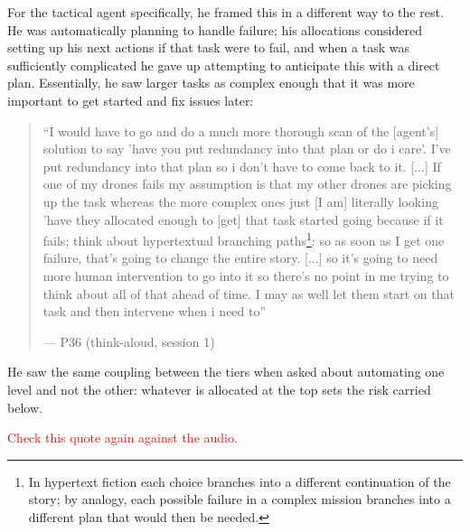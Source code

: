 For the tactical agent specifically, he framed this in a different way to the rest. He was automatically planning to handle failure; his allocations considered setting up his next actions if that task were to fail, and when a task was sufficiently complicated he gave up attempting to anticipate this with a direct plan. Essentially, he saw larger tasks as complex enough that it was more important to get started and fix issues later:

\begin{quote}\small
``I would have to go and do a much more thorough scan of the [agent's] solution to say 'have you put redundancy into that plan or do i care'. I've put redundancy into that plan so i don't have to come back to it. [...] If one of my drones fails my assumption is that my other drones are picking up the task whereas the more complex ones just [I am] literally looking 'have they allocated enough to [get] that task started going because if it fails; think about hypertextual branching paths\footnote{{\color{blue}In hypertext fiction each choice branches into a different continuation of the story; by analogy, each possible failure in a complex mission branches into a different plan that would then be needed.}}: so as soon as I get one failure, that's going to change the entire story. [...] so it's going to need more human intervention to go into it so there's no point in me trying to think about all of that ahead of time. I may as well let them start on that task and then intervene when i need to''\par\hfill--- P36 (think-aloud, session 1)
\end{quote}

{\color{blue}He saw the same coupling between the tiers when asked about automating one level and not the other: whatever is allocated at the top sets the risk carried below.}

\textcolor{red}{Check this quote again against the audio.}

